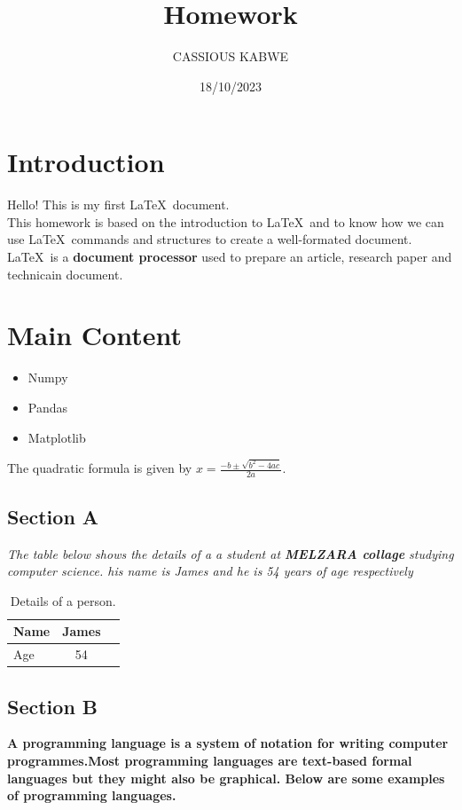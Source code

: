 \documentclass{article}
\title{Homework}
\author{CASSIOUS KABWE}
\date{18/10/2023}
\begin{document}
 \maketitle
 \section{Introduction}
 Hello! This is my first \LaTeX\ document.\\
 This homework is based on the introduction to \LaTeX\ and to know how we can use \LaTeX\ commands and structures to create a well-formated document.
\LaTeX\ is a \textbf{document processor} used to prepare an article, research paper and technicain document.\cite{Smith,J.(2000).A Sample Book}
 
 \section{Main Content}
 \begin{itemize}
    \item Numpy
    \item Pandas
    \item Matplotlib
 \end{itemize}

 The quadratic formula is given by $x=\frac{-b\pm\sqrt{b^2-4ac}}{2a}$.

\subsection{Section A}
\textit{The table below shows the details of a a student at \textbf{MELZARA collage} studying computer science.
his name is James and he is 54 years of age respectively}
\begin{table}[h]
   \caption{Details of a person.}
    \begin{tabular}{|l|c|r|}
        \hline
        Name&James\\ \hline
        Age&54\\ \hline
    \end{tabular}
 \end{table}

 
 \subsection{Section B}
\textbf{A programming language is a system of notation for writing computer programmes.Most programming languages are text-based formal languages but they might also be graphical. Below are some examples of programming languages.}
\end{document}
